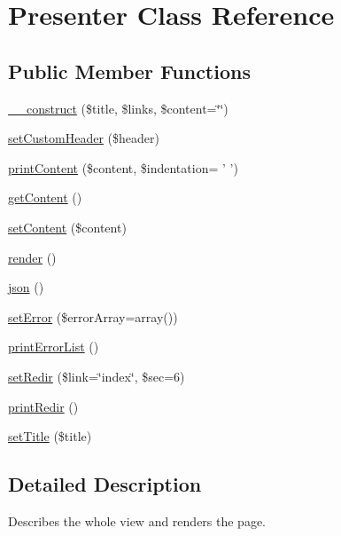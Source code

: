 \hypertarget{classPresenter}{\section{Presenter Class Reference}
\label{classPresenter}
}
\subsection*{Public Member Functions}
\begin{DoxyCompactItemize}
\item 
\hyperlink{classPresenter_a364fc50678030d816f515223be72b23a}{\+\_\+\+\_\+construct} (\$title, \$links, \$content=\char`\"{}\char`\"{})
\item 
\hyperlink{classPresenter_a299e31916fc252227e369fc5efad77f9}{set\+Custom\+Header} (\$header)
\item 
\hyperlink{classPresenter_a327ab1b725813be28114753935b42cd4}{print\+Content} (\$content, \$indentation= ' ')
\item 
\hyperlink{classPresenter_a8a9d11db6633e0ebb898abd4580f8988}{get\+Content} ()
\item 
\hyperlink{classPresenter_a9a7d0d294934548d13620baca0657087}{set\+Content} (\$content)
\item 
\hyperlink{classPresenter_a2194a46cf6c23dd4e483f1ee63bc2236}{render} ()
\item 
\hyperlink{classPresenter_a02088a50a3134097a1b785b0315937b6}{json} ()
\item 
\hyperlink{classPresenter_a1d66815ed950c7362a9c87bbcc6d9b7b}{set\+Error} (\$error\+Array=array())
\item 
\hyperlink{classPresenter_a5e4fe61038c5535719c6d7bc3b557019}{print\+Error\+List} ()
\item 
\hyperlink{classPresenter_a7dffb86806a017ebd3e13ca331c6f15a}{set\+Redir} (\$link=\char`\"{}index\char`\"{}, \$sec=6)
\item 
\hyperlink{classPresenter_ace2a8a72ee53e6be953614d00e29f741}{print\+Redir} ()
\item 
\hyperlink{classPresenter_a80cf6f790c8705d20632f7e3a73947fe}{set\+Title} (\$title)
\end{DoxyCompactItemize}


\subsection{Detailed Description}
Describes the whole view and renders the page.

